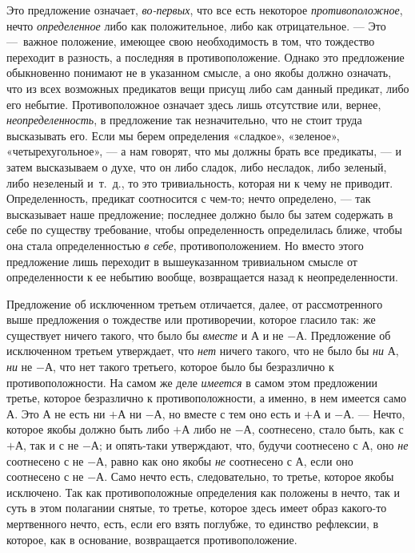 Это предложение означает, {\em во-первых}, что все есть
некоторое {\em противоположное}, нечто
{\em определенное} либо как положительное, либо как
отрицательное. — Это —~важное положение, имеющее свою необходимость в том,
что тождество переходит в разность, а последняя в противоположение. Однако
это предложение обыкновенно понимают не в указанном смысле, а оно якобы
должно означать, что из всех возможных предикатов вещи присущ либо сам
данный предикат, либо его небытие. Противоположное означает здесь лишь
отсутствие или, вернее, {\em неопределенность}, в
предложение так незначительно, что не стоит труда высказывать его. Если мы
берем определения «сладкое», «зеленое», «четырехугольное», — а нам говорят,
что мы должны брать все предикаты, — и затем высказываем о духе, что он
либо сладок, либо несладок, либо зеленый, либо незеленый и~т.~д., то это
тривиальность, которая ни к чему не приводит. Определенность, предикат
соотносится с чем-то; нечто определено, — так высказывает наше предложение;
последнее должно было бы затем содержать в себе по существу требование,
чтобы определенность определилась ближе, чтобы она стала определенностью
{\em в себе}, противоположением. Но вместо этого
предложение лишь переходит в вышеуказанном тривиальном смысле от
определенности к ее небытию вообще, возвращается назад к неопределенности.

Предложение об исключенном третьем отличается, далее, от рассмотренного выше
предложения о тождестве или противоречии, которое гласило так: же
существует ничего такого, что было бы {\em вместе} и
$А$ и не $-А$. Предложение об исключенном третьем утверждает,
что {\em нет} ничего такого, что не было бы
{\em ни} $А$, {\em ни}
не $-А$, что нет такого третьего, которое было бы безразлично к
противоположности. На самом же деле {\em имеется} в
самом этом предложении третье, которое безразлично к противоположности, а
именно, в нем имеется само $А$. Это $А$ не есть ни
$+А$ ни $-А$, но вместе с тем оно есть и $+А$ и
$-А$. — Нечто, которое якобы должно быть либо $+А$ либо
не $-А$, соотнесено, стало быть, как с $+А$, так и с
не $-А$; и опять-таки утверждают, что, будучи соотнесено с
$А$, оно {\em не} соотнесено с не $-А$,
равно как оно якобы {\em не} соотнесено с $А$,
если оно соотнесено с не $-А$. Само нечто есть, следовательно, то
третье, которое якобы исключено. Так как противоположные определения как
положены в нечто, так и суть в этом полагании снятые, то третье, которое
здесь имеет образ какого-то мертвенного нечто, есть, если его взять
поглубже, то единство рефлексии, в которое, как в основание, возвращается
противоположение.

